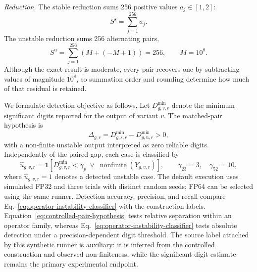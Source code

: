 \documentclass[manuscript, screen]{acmart}
\begin{document}
\emph{Reduction.}
The stable reduction sums 256 positive values $a_j\in[1,2]$:
\begin{equation}
S^{\mathrm{s}}=\sum_{j=1}^{256}a_j.
\label{eq:controlled-reduction-stable}
\end{equation}
The unstable reduction sums 256 alternating pairs,
\begin{equation}
S^{\mathrm{u}}
=
\sum_{j=1}^{256}\left(M+(-M+1)\right)
=
256,
\qquad
M=10^8.
\label{eq:controlled-reduction-unstable}
\end{equation}
Although the exact result is moderate, every pair recovers one by subtracting values of magnitude $10^8$, so summation order and rounding determine how much of that residual is retained.

We formulate detection objective as follows. Let $D_{g,v,r}^{\min}$ denote the minimum significant digits reported for the output of variant $v$. The matched-pair hypothesis is
\begin{equation}
\Delta_{g,r}
=
D_{g,\mathrm{s},r}^{\min}
-
D_{g,\mathrm{u},r}^{\min}
>0,
\label{eq:controlled-pair-hypothesis}
\end{equation}
with a non-finite unstable output interpreted as zero reliable digits. Independently of the paired gap, each case is classified by
\begin{equation}
\widehat{u}_{g,v,r}
=
\mathbf{1}\!\left[
D_{g,v,r}^{\min}<\gamma_p
\;\lor\;
\operatorname{nonfinite}(Y_{g,v,r})
\right],
\qquad
\gamma_{23}=3,\quad \gamma_{52}=10,
\label{eq:operator-instability-classifier}
\end{equation}
where $\widehat{u}_{g,v,r}=1$ denotes a detected unstable case. The default execution uses simulated FP32 and three trials with distinct random seeds; FP64 can be selected using the same runner. Detection accuracy, precision, and recall compare Eq.~\eqref{eq:operator-instability-classifier} with the construction labels. Equation~\eqref{eq:controlled-pair-hypothesis} tests relative separation within an operator family, whereas Eq.~\eqref{eq:operator-instability-classifier} tests absolute detection under a precision-dependent digit threshold. The source label attached by this synthetic runner is auxiliary: it is inferred from the controlled construction and observed non-finiteness, while the significant-digit estimate remains the primary experimental endpoint.
\end{document}
